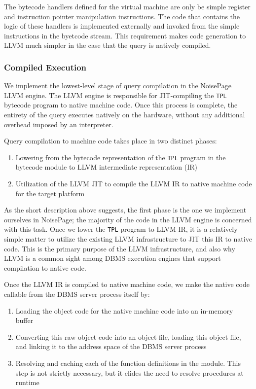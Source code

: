 \documentclass{vldb}
\newcommand{\tpl}{\texttt{TPL}\xspace}
\begin{document}
The bytecode handlers defined for the virtual machine are only be simple register and instruction pointer manipulation instructions. The code that contains the logic of these handlers is implemented externally and invoked from the simple instructions in the byetcode stream. This requirement makes code generation to LLVM much simpler in the case that the query is natively compiled.

\subsubsection{Compiled Execution}

We implement the lowest-level stage of query compilation in the NoisePage LLVM engine. The LLVM engine is responsible for JIT-compiling the \tpl bytecode program to native machine code. Once this process is complete, the entirety of the query executes natively on the hardware, without any additional overhead imposed by an interpreter.

Query compilation to machine code takes place in two distinct phases:

\begin{enumerate}
    \item Lowering from the bytecode representation of the \tpl program in the bytecode module to LLVM intermediate representation (IR)
    \item Utilization of the LLVM JIT to compile the LLVM IR to native machine code for the target platform
\end{enumerate}

As the short description above suggests, the first phase is the one we implement ourselves in NoisePage; the majority of the code in the LLVM engine is concerned with this task. Once we lower the \tpl program to LLVM IR, it is a relatively simple matter to utilize the existing LLVM infrastructure to JIT this IR to native code. This is the primary purpose of the LLVM infrastructure, and also why LLVM is a common sight among DBMS execution engines that support compilation to native code.

Once the LLVM IR is compiled to native machine code, we make the native code callable from the DBMS server process itself by:

\begin{enumerate}
    \item Loading the object code for the native machine code into an in-memory buffer
    \item Converting this raw object code into an object file, loading this object file, and linking it to the address space of the DBMS server process
    \item Resolving and caching each of the function definitions in the module. This step is not strictly necessary, but it elides the need to resolve procedures at runtime
\end{enumerate}
\end{document}
